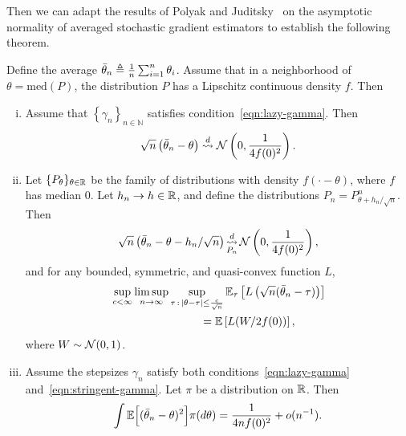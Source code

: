 Then we can adapt the results of Polyak and Juditsky~\cite{PolyakJu92}
on the asymptotic normality of averaged stochastic gradient estimators
to establish the following theorem.
\begin{thm}
  \label{thm:sgd}
  Define the average $\bar{\theta}_n \triangleq \frac{1}{n}
  \sum_{i = 1}^n \theta_i$. Assume
  that in a neighborhood
  of $\theta = \mbox{med}(P)$,
  the distribution $P$ has a Lipschitz continuous density $f$.
  Then
  \begin{enumerate}[(i)]
  \item \label{item:normal-sgd}
    Assume that $\left\{ \gamma_n \right\}_{n\in \mathbb N}$ satisfies
    condition~\eqref{eqn:lazy-gamma}.
    Then
    \begin{equation*}
      \sqrt{n}\left( \bar{\theta}_n - \theta\right)
      \stackrel{d}{\rightsquigarrow} \mathcal{N}\left(0,\frac{1}{4 f(0)^2}\right).
    \end{equation*}
  \item \label{item:sgd-regular}
    Let $\{P_\theta\}_{\theta \in \mathbb{R}}$ be the family of distributions
    with density $f(\cdot - \theta)$, where $f$ has median 0.
    Let $h_n \to h \in \mathbb{R}$, and define the distributions
    $P_n = P_{\theta + h_n/\sqrt{n}}^n$. Then
    \begin{equation*}
      \sqrt{n}\left(\bar{\theta}_n - \theta - h_n / \sqrt{n}\right)
      \mathop{\stackrel{d}{\rightsquigarrow}}_{P_n}
      \mathcal{N}\left(0, \frac{1}{4 f(0)^2}\right),
    \end{equation*}
    and for any bounded, symmetric, and quasi-convex function $L$,
    \begin{align} 
      & \sup_{c < \infty} \limsup_{n \to \infty}
      \sup_{\tau\,:\,|\theta-\tau| \leq \frac{c}{\sqrt{n} }}
      \mathbb{E}_\tau \left[ L\left( \sqrt{n}(\bar{\theta}_{n} - \tau) \right) \right] \nonumber 
      \\
      & \qquad \qquad \qquad \qquad = \mathbb E \left[L(W/ 2 f(0)) \right],
        \label{eq:attaining_LAM}
    \end{align}
    where $W \sim \mathcal{N}(0,1)$. 
  \item \label{item:sgd-ms-convergence} Assume the stepsizes $\gamma_n$
    satisfy both conditions~\eqref{eqn:lazy-gamma}
    and~\eqref{eqn:stringent-gamma}. Let
    $\pi$ be a distribution on $\mathbb{R}$. Then
    \begin{equation*}
      \int \mathbb{E}\Big[( \bar{\theta}_n - \theta )^2\Big] \pi(d\theta)
      = \frac{1}{4 n f(0)^2} + o(n^{-1}). 
    \end{equation*}
  \end{enumerate}
\end{thm}

